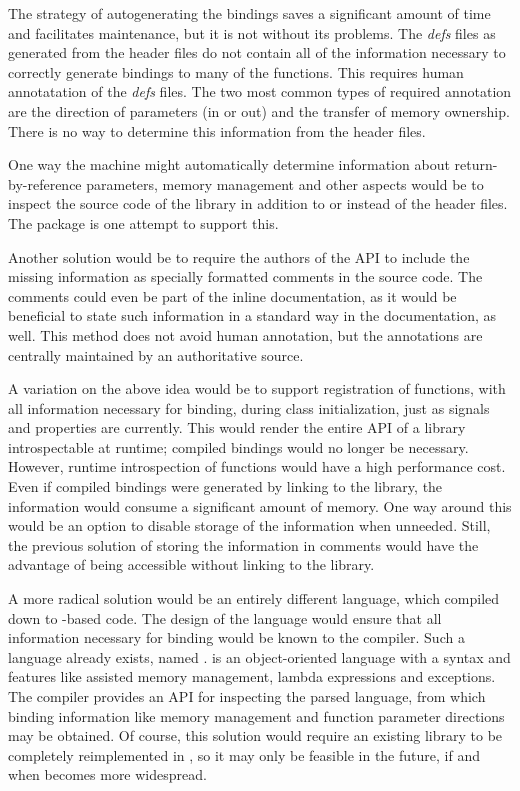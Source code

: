 \documentclass[article]{jss}
\begin{document}
The strategy of autogenerating the bindings saves a significant amount
of time and facilitates maintenance, but it is not without its problems.
The \emph{defs} files as generated from the header files do not contain all
of the information necessary to correctly generate bindings to many
of the  functions. This requires human annotatation of the \emph{defs}
files.  The two most common types of required annotation are the direction
of parameters (in or out) and the transfer of memory ownership. There is no
way to determine this information from the header files. 

One way the machine might automatically determine information about
return-by-reference parameters, memory management and other aspects
would be to inspect the  source code of the library in addition to
or instead of the header files. The  package \citep*{RGCCTU}
is one attempt to support this.

Another solution would be to require the authors of the API to include the 
missing information as specially formatted comments in the source code. The
comments could even be part of the inline documentation, as it would be
beneficial to state such information in a standard way in the
documentation, as well. This method does not avoid human annotation, but
the annotations are centrally maintained by an authoritative source. 

A variation on the above idea would be to support registration of
functions, with all information necessary for binding, during class 
initialization, just as signals and properties are currently. This would render
the entire API of a library introspectable at runtime; compiled bindings would
no longer be necessary. However, runtime introspection of functions would
have a high performance cost. Even if compiled bindings were generated by
linking to the library, the information would consume a significant amount of 
memory. One way around this would be an option to disable storage of the
information when unneeded. Still, the previous solution of storing
the information in comments would have the advantage of being accessible
without linking to the library.

A more radical solution would be an entirely different language, which
compiled down to -based  code. The design of the
language would ensure that all information necessary for binding would
be known to the compiler. Such a language already exists, named  \citep{vala}. 
 is an object-oriented language with
a  syntax and features like assisted memory management, lambda expressions and 
exceptions. The  compiler provides an API for inspecting
the parsed language, from which binding information like memory management
and function parameter directions may be obtained. Of course, this
solution would require an existing library to be completely reimplemented in
, so it may only be feasible in the future, if and when
 becomes more widespread.
\end{document}
